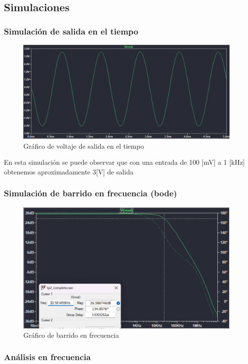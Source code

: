 \newpage
\subsection{Simulaciones}

\subsubsection{Simulación de salida en el tiempo}
 
\begin{figure}[h!]
    \centering
    \includegraphics[width=0.80\linewidth]{img/tiempo.png}
    \caption{Gráfico de voltaje de salida en el tiempo}
    \label{fig:1a_tiempo}
\end{figure}

En esta simulación se puede observar que con una entrada de 100 [mV] a 1 [kHz] obtenemos aproximadamente 3[V] de salida


\subsubsection{Simulación de barrido en frecuencia (bode)}
\begin{figure}[h!]
    \centering
    \includegraphics[width=0.80\linewidth]{img/bode1a.png}
    \caption{Gráfico de barrido en frecuencia}
    \label{fig:bode1a}
\end{figure}


\subsubsection{Análisis en frecuencia }

